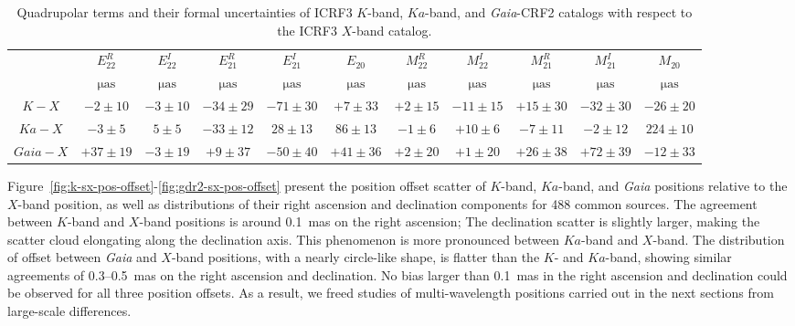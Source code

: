\documentclass{aa-note}   %
\begin{document}
\begin{table}[htbp]
    \centering
    \caption{\label{tab:vsh02}
        Quadrupolar terms and their formal uncertainties of ICRF3 $K$-band, $Ka$-band, and \textit{Gaia}-CRF2 catalogs with respect to the ICRF3 $X$-band catalog.
    }
    \begin{tabular}{ccccccccccc}
        \hline \noalign{\smallskip}
        &$E_{22}^R$  &$E_{22}^I$  &$E_{21}^R$  &$E_{21}^I$  &$E_{20}$    &$M_{22}^R$  &$M_{22}^I$  &$M_{21}^R$  &$M_{21}^I$  &$M_{20}$    \\ 
        & $\mathrm{\mu as}$ & $\mathrm{\mu as}$  & $\mathrm{\mu as}$ & $\mathrm{\mu as}$ & $\mathrm{\mu as}$& $\mathrm{\mu as}$ & $\mathrm{\mu as}$ & $\mathrm{\mu as}$  & $\mathrm{\mu as}$ & $\mathrm{\mu as}$  \\
        \noalign{\smallskip}
        \hline
        \noalign{\smallskip}
        $K - X$      &$   -2 \pm    10 $  &$   -3 \pm    10 $  &$  -34 \pm    29 $  &$  -71 \pm    30 $  &$   +7 \pm    33 $  &$   +2 \pm    15 $  &$  -11 \pm    15 $  &$  +15 \pm    30 $  &$  -32 \pm    30 $  &$  -26 \pm    20 $ \\
        $Ka - X$  &$   -3 \pm     5 $  &$    5 \pm     5 $  &$  -33 \pm    12 $  &$   28 \pm    13 $  &$   86 \pm    13 $  &$   -1 \pm     6 $  &$  +10 \pm     6 $  &$   -7 \pm    11 $  &$   -2 \pm    12 $  &$  224 \pm    10 $ \\
        $Gaia - X$    &$  +37 \pm    19 $  &$   -3 \pm    19 $  &$  +9 \pm    37 $   &$  -50 \pm    40 $  &$  +41 \pm    36 $  &$   +2 \pm    20 $  &$   +1 \pm    20 $  &$  +26 \pm    38 $  &$  +72 \pm    39 $  &$  -12 \pm    33 $ \\
        \hline\end{tabular}
\end{table}
%

Figure~\ref{fig:k-sx-pos-offset}-\ref{fig:gdr2-sx-pos-offset} present the position offset scatter of $K$-band, $Ka$-band, and \textit{Gaia} positions relative to the $X$-band position, as well as distributions of their right ascension and declination components for 488 common sources.
The agreement between $K$-band and $X$-band positions is around 0.1~mas on the right ascension;
The declination scatter is slightly larger, making the scatter cloud elongating along the declination axis.
This phenomenon is more pronounced between $Ka$-band and $X$-band.
The distribution of offset between \textit{Gaia} and $X$-band positions, with a nearly circle-like shape, is flatter than the $K$- and $Ka$-band, showing similar agreements of 0.3--0.5~mas on the right ascension and declination.
No bias larger than 0.1~mas in the right ascension and declination could be observed for all three position offsets.
As a result, we freed studies of multi-wavelength positions carried out in the next sections from large-scale differences. %
\end{document}
